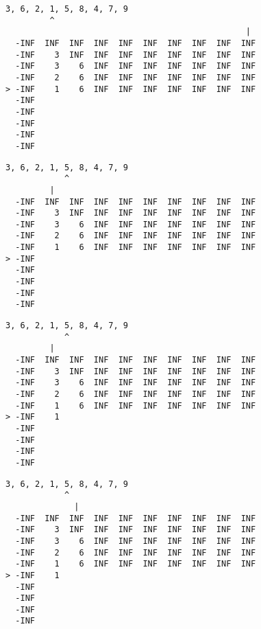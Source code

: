 { \begin{verbatim}
3, 6, 2, 1, 5, 8, 4, 7, 9
         ^
                                                 |
  -INF  INF  INF  INF  INF  INF  INF  INF  INF  INF
  -INF    3  INF  INF  INF  INF  INF  INF  INF  INF
  -INF    3    6  INF  INF  INF  INF  INF  INF  INF
  -INF    2    6  INF  INF  INF  INF  INF  INF  INF
> -INF    1    6  INF  INF  INF  INF  INF  INF  INF
  -INF                                             
  -INF                                             
  -INF                                             
  -INF                                             
  -INF                                             
\end{verbatim} }

{ \begin{verbatim}
3, 6, 2, 1, 5, 8, 4, 7, 9
            ^
         |
  -INF  INF  INF  INF  INF  INF  INF  INF  INF  INF
  -INF    3  INF  INF  INF  INF  INF  INF  INF  INF
  -INF    3    6  INF  INF  INF  INF  INF  INF  INF
  -INF    2    6  INF  INF  INF  INF  INF  INF  INF
  -INF    1    6  INF  INF  INF  INF  INF  INF  INF
> -INF                                             
  -INF                                             
  -INF                                             
  -INF                                             
  -INF                                             
\end{verbatim} }

{ \begin{verbatim}
3, 6, 2, 1, 5, 8, 4, 7, 9
            ^
         |
  -INF  INF  INF  INF  INF  INF  INF  INF  INF  INF
  -INF    3  INF  INF  INF  INF  INF  INF  INF  INF
  -INF    3    6  INF  INF  INF  INF  INF  INF  INF
  -INF    2    6  INF  INF  INF  INF  INF  INF  INF
  -INF    1    6  INF  INF  INF  INF  INF  INF  INF
> -INF    1                                        
  -INF                                             
  -INF                                             
  -INF                                             
  -INF                                             
\end{verbatim} }

{ \begin{verbatim}
3, 6, 2, 1, 5, 8, 4, 7, 9
            ^
              |
  -INF  INF  INF  INF  INF  INF  INF  INF  INF  INF
  -INF    3  INF  INF  INF  INF  INF  INF  INF  INF
  -INF    3    6  INF  INF  INF  INF  INF  INF  INF
  -INF    2    6  INF  INF  INF  INF  INF  INF  INF
  -INF    1    6  INF  INF  INF  INF  INF  INF  INF
> -INF    1                                        
  -INF                                             
  -INF                                             
  -INF                                             
  -INF                                             
\end{verbatim} }

